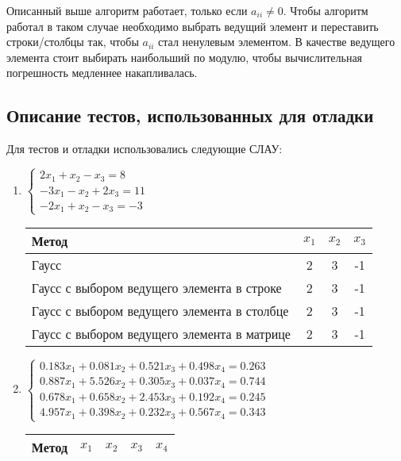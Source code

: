 \documentclass[14pt, a4paper]{extarticle}
\begin{document}
		Описанный выше алгоритм работает, только если $a_{ii} \neq 0$. Чтобы алгоритм работал в таком случае необходимо выбрать ведущий элемент и переставить строки/столбцы так, чтобы $a_{ii}$ стал ненулевым элементом. В качестве ведущего элемента стоит выбирать наибольший по модулю, чтобы вычислительная погрешность медленнее накапливалась.
	
	\subsection{Описание тестов, использованных для отладки}
		Для тестов и отладки использовались следующие СЛАУ:
		\begin{enumerate}
			\item $ \begin{cases}
						2x_1 + x_2 - x_3 = 8\\
						-3x_1 - x_2 + 2x_3 = 11\\
						-2x_1 + x_2 - x_3 = -3
					\end{cases}$ 
				\begin{center}
					\begin{tabular}{ |m{10em}|c|c|c| }
						\hline
						Метод & $x_1$& $x_2$& $x_3$\\
						\hline
						Гаусс & 2 & 3 & -1\\
						\hline
						Гаусс с выбором ведущего элемента в строке  & 2 & 3 & -1\\
						\hline
						Гаусс с выбором ведущего элемента в столбце  & 2 & 3 & -1\\
						\hline
						Гаусс с выбором ведущего элемента в матрице  & 2 & 3 & -1\\
						\hline
					\end{tabular}
				\end{center}
			\item $ \begin{cases}
						0.183x_1 + 0.081x_2 + 0.521x_3 + 0.498x_4 = 0.263\\
						0.887x_1 + 5.526x_2 + 0.305x_3 + 0.037x_4 = 0.744\\
						0.678x_1 + 0.658x_2 + 2.453x_3 + 0.192x_4 = 0.245\\
						4.957x_1 + 0.398x_2 + 0.232x_3 + 0.567x_4 = 0.343
					\end{cases}$
				\begin{center}
					\begin{tabular}{ |m{10em}|c|c|c|c| }
						\hline
						Метод & $x_1$& $x_2$& $x_3$& $x_4$\\
						\hline

\end{tabular}
\end{center}
\end{enumerate}
\end{document}
